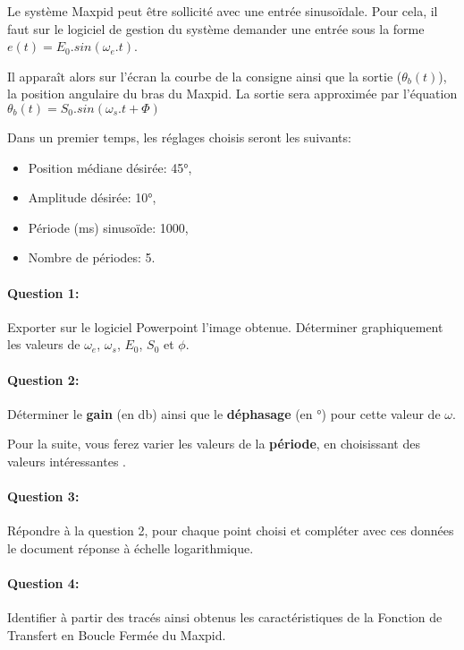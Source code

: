 

\ifdef{\public}{\cleardoublepage}{}



Le système Maxpid peut être sollicité avec une entrée sinusoïdale. Pour cela, il faut sur le logiciel de gestion du système demander une entrée sous la forme $e(t)=E_0.sin(\omega_e.t)$.

Il apparaît alors sur l'écran la courbe de la consigne ainsi que la sortie ($\theta_b(t)$), la position angulaire du bras du Maxpid. La sortie sera approximée par l'équation $\theta_b(t)=S_0.sin(\omega_s.t+\Phi)$

Dans un premier temps, les réglages choisis seront les suivants:
\begin{itemize}
 \item Position médiane désirée: 45°,
 \item Amplitude désirée: 10°,
 \item Période (ms) sinusoïde: 1000,
 \item Nombre de périodes: 5.
\end{itemize}

\paragraph{Question 1:} Exporter sur le logiciel Powerpoint l'image obtenue. Déterminer graphiquement les valeurs de $\omega_e$, $\omega_s$, $E_0$, $S_0$ et $\phi$.

\paragraph{Question 2:} Déterminer le \textbf{gain} (en db) ainsi que le \textbf{déphasage} (en °) pour cette valeur de $\omega$.

Pour la suite, vous ferez varier les valeurs de la \textbf{période}, en choisissant des valeurs \og intéressantes \fg.

\paragraph{Question 3:} Répondre à la question 2, pour chaque point choisi et compléter avec ces données le document réponse à échelle logarithmique.

\paragraph{Question 4:} Identifier à partir des tracés ainsi obtenus les caractéristiques de la Fonction de Transfert en Boucle Fermée du Maxpid.

